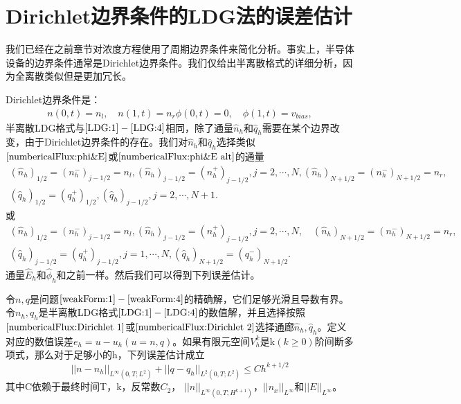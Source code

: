 \documentclass[lang=cn,newtx,10pt,scheme=chinese]{elegantbook}
\begin{document}
\chapter{Dirichlet边界条件的LDG法的误差估计}
我们已经在之前章节对浓度方程使用了周期边界条件来简化分析。事实上，半导体设备的边界条件通常是Dirichlet边界条件。我们仅给出半离散格式的详细分析，因为全离散类似但是更加冗长。

Dirichlet边界条件是：
\begin{align}
    n(0,t) = n_l,\quad n(1,t) = n_r
    \phi(0,t) = 0, \quad \phi(1,t) = v_{bias},
\end{align}
半离散LDG格式与$\ref{LDG:1}-\ref{LDG:4}$相同，除了通量$\hat{n}_h$和$\hat{q}_h$需要在某个边界改变，由于Dirichlet边界条件的存在。我们对$\hat{n}_h$和$\hat{q}_h$选择类似$\ref{numbericalFlux:phi&E}$或$\ref{numbericalFlux:phi&E alt}$的通量
\begin{align}
    (\hat{n}_h)_{1/2} = (n_h^-)_{j-1/2} =n_l, (\hat{n}_h)_{j-1/2} =  (n_h^+)_{j-1/2},j=2,\cdots,N,  (\hat{n}_h)_{N+1/2} = (n_h^-)_{N+1/2} = n_r, \nonumber \\
    (\hat{q}_h)_{1/2} = (q_h^+)_{1/2}, (\hat{q}_h)_{j-1/2},j=2,\cdots,N+1. \label{numbericalFlux:Dirichlet 1}
\end{align}
或
\begin{align}
    (\hat{n}_h)_{1/2} = (n_h^-)_{j-1/2} = n_l, (\hat{n}_h)_{j-1/2} = (n_h^+)_{j-1/2},j=2,\cdots,N,\quad (\hat{n}_h)_{N+1/2} = (n_h^-)_{N+1/2} = n_r, \nonumber \\
    (\hat{q}_h)_{j - 1/2} = (q_h^+)_{j - 1/2}, j = 1,\cdots,N,(\hat{q}_h)_{N+1/2} = (q_h^-)_{N+1/2}.\label{numbericalFlux:Dirichlet 2}
\end{align}
通量$\hat{E}_h$和$\hat{\phi}_h$和之前一样。然后我们可以得到下列误差估计。
\begin{theorem}\label{theo:6.1}
    令$n,q$是问题$\ref{weakForm:1}-\ref{weakForm:4}$的精确解，它们足够光滑且导数有界。令$n_h,q_h$是半离散LDG格式$\ref{LDG:1} - \ref{LDG:4}$的数值解，并且选择按照$\ref{numbericalFlux:Dirichlet 1}$或$\ref{numbericalFlux:Dirichlet 2}$选择通廊$\hat{n}_h,\hat{q}_h$。定义对应的数值误差$e_h = u-u_h(u = n,q)$。如果有限元空间$V_h^k$是k$(k\geq  0)$阶间断多项式，那么对于足够小的h，下列误差估计成立
    \begin{equation}
        ||n-n_h||_{L^{\infty}(0,T;L^2)} + ||q - q_h||_{L^2(0,T;L^2)} \leq Ch^{k+1/2}
    \end{equation}
    其中C依赖于最终时间T，k，反常数$C_2$， $||n||_{L^{\infty}(0,T;H^{k+1})}$，$||n_x||_{L^{\infty}}$和$||E||_{L^{\infty}}$。
\end{theorem}
\end{document}
